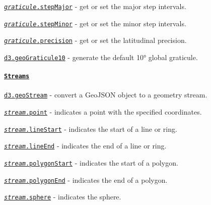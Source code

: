 \begin{DoxyItemize}
\item \href{https://github.com/d3/d3-geo/blob/master/README.md#graticule_stepMajor}{\tt {\itshape graticule}.step\+Major} -\/ get or set the major step intervals.
\item \href{https://github.com/d3/d3-geo/blob/master/README.md#graticule_stepMinor}{\tt {\itshape graticule}.step\+Minor} -\/ get or set the minor step intervals.
\item \href{https://github.com/d3/d3-geo/blob/master/README.md#graticule_precision}{\tt {\itshape graticule}.precision} -\/ get or set the latitudinal precision.
\item \href{https://github.com/d3/d3-geo/blob/master/README.md#geoGraticule10}{\tt d3.\+geo\+Graticule10} -\/ generate the default 10° global graticule.
\end{DoxyItemize}

\paragraph*{\href{https://github.com/d3/d3-geo/blob/master/README.md#streams}{\tt Streams}}


\begin{DoxyItemize}
\item \href{https://github.com/d3/d3-geo/blob/master/README.md#geoStream}{\tt d3.\+geo\+Stream} -\/ convert a Geo\+J\+S\+ON object to a geometry stream.
\item \href{https://github.com/d3/d3-geo/blob/master/README.md#stream_point}{\tt {\itshape stream}.point} -\/ indicates a point with the specified coordinates.
\item \href{https://github.com/d3/d3-geo/blob/master/README.md#stream_lineStart}{\tt {\itshape stream}.line\+Start} -\/ indicates the start of a line or ring.
\item \href{https://github.com/d3/d3-geo/blob/master/README.md#stream_lineEnd}{\tt {\itshape stream}.line\+End} -\/ indicates the end of a line or ring.
\item \href{https://github.com/d3/d3-geo/blob/master/README.md#stream_polygonStart}{\tt {\itshape stream}.polygon\+Start} -\/ indicates the start of a polygon.
\item \href{https://github.com/d3/d3-geo/blob/master/README.md#stream_polygonEnd}{\tt {\itshape stream}.polygon\+End} -\/ indicates the end of a polygon.
\item \href{https://github.com/d3/d3-geo/blob/master/README.md#stream_sphere}{\tt {\itshape stream}.sphere} -\/ indicates the sphere.
\end{DoxyItemize}

